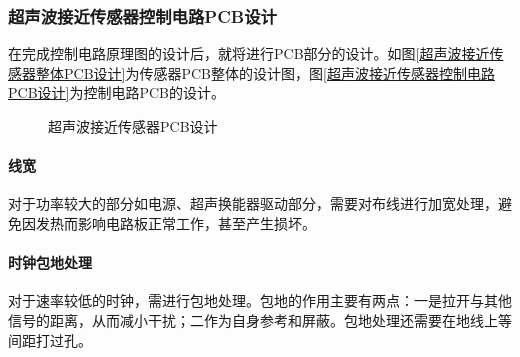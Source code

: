        \subsubsection{超声波接近传感器控制电路PCB设计}
       在完成控制电路原理图的设计后，就将进行PCB部分的设计。如图\ref{超声波接近传感器整体PCB设计}为传感器PCB整体的设计图，图\ref{超声波接近传感器控制电路PCB设计}为控制电路PCB的设计。
\begin{figure}[ht]
	\centering
	\caption{超声波接近传感器PCB设计}
	\label{超声波接近传感器PCB设计}
\end{figure}
   \paragraph{线宽}
   对于功率较大的部分如电源、超声换能器驱动部分，需要对布线进行加宽处理，避免因发热而影响电路板正常工作，甚至产生损坏。\par
   \paragraph{时钟包地处理}
   对于速率较低的时钟，需进行包地处理。包地的作用主要有两点：一是拉开与其他信号的距离，从而减小干扰；二作为自身参考和屏蔽。包地处理还需要在地线上等间距打过孔。
  
